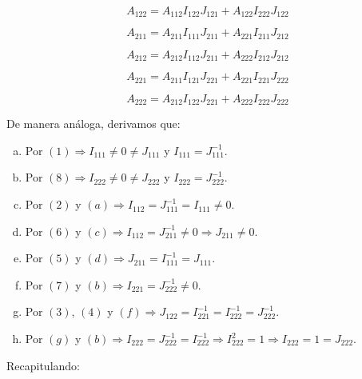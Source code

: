 \documentclass[a4paper, titlepage]{article}
\begin{document}
\begin{equation}
A_{122} = A_{112} I_{122} J_{121} + A_{122} I_{222} J_{122}
\end{equation}

\begin{equation}
A_{211} = A_{211} I_{111} J_{211} + A_{221} I_{211} J_{212}
\end{equation}

\begin{equation}
A_{212} = A_{212} I_{112} J_{211} + A_{222} I_{212} J_{212}
\end{equation}

\begin{equation}
A_{221} = A_{211} I_{121} J_{221} + A_{221} I_{221} J_{222}
\end{equation}

\begin{equation}
A_{222} = A_{212} I_{122} J_{221} + A_{222} I_{222} J_{222}
\end{equation}

De manera análoga, derivamos que:

\begin{enumerate}[(a)]
	\item Por $(1) \Rightarrow I_{111} \neq 0 \neq J_{111}$ y $I_{111} = J_{111}^{-1}$.
	\item Por $(8) \Rightarrow I_{222} \neq 0 \neq J_{222}$ y $I_{222} = J_{222}^{-1}$.
	\item Por $(2)$ y $(a) \Rightarrow I_{112} = J_{111}^{-1} = I_{111} \neq 0$.
	\item Por $(6)$ y $(c) \Rightarrow I_{112} = J_{211}^{-1} \neq 0 \Rightarrow J_{211} \neq 0$.
	\item Por $(5)$ y $(d) \Rightarrow J_{211} = I_{111}^{-1} = J_{111}$.
	\item Por $(7)$ y $(b) \Rightarrow I_{221} = J_{222}^{-1} \neq 0$.
	\item Por $(3)$, $(4)$ y $(f) \Rightarrow J_{122} = I_{221}^{-1} = I_{222}^{-1} = J_{222}^{-1}$.
	\item Por $(g)$ y $(b) \Rightarrow I_{222} = J_{222}^{-1} = I_{222}^{-1} \Rightarrow I_{222}^2 = 1 \Rightarrow I_{222} = 1 = J_{222}$.
\end{enumerate}

\newpage

Recapitulando:
\end{document}
